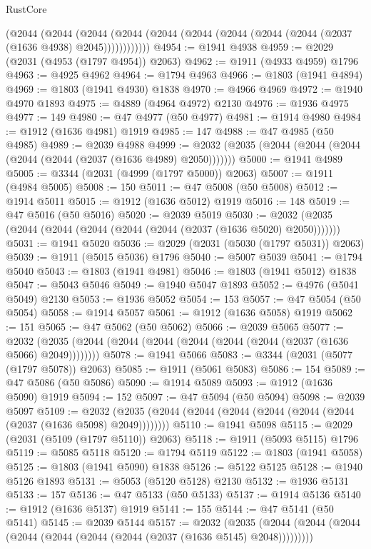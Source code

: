 \begin{lexlean}{RustCore}
\begin{coremodule}
        (@2044
          (@2044
            (@2044 (@2044 (@2044 (@2044 (@2044 (@2044 (@2044 (@2037 (@1636 @4938) @2045))))))))))))
@4954 := @1941 @4938
@4959 := @2029 (@2031 (@4953 (@1797 @4954)) @2063)
@4962 := @1911 (@4933 @4959) @1796
@4963 := @4925 @4962
@4964 := @1794 @4963
@4966 := @1803 (@1941 @4894)
@4969 := @1803 (@1941 @4930) @1838
@4970 := @4966 @4969
@4972 := @1940 @4970 @1893
@4975 := @4889 (@4964 @4972) @2130
@4976 := @1936 @4975
@4977 := 149
@4980 := @47 @4977 (@50 @4977)
@4981 := @1914 @4980
@4984 := @1912 (@1636 @4981) @1919
@4985 := 147
@4988 := @47 @4985 (@50 @4985)
@4989 := @2039 @4988
@4999 := @2032 (@2035 (@2044 (@2044 (@2044 (@2044 (@2044 (@2037 (@1636 @4989) @2050)))))))
@5000 := @1941 @4989
@5005 := @3344 (@2031 (@4999 (@1797 @5000)) @2063)
@5007 := @1911 (@4984 @5005)
@5008 := 150
@5011 := @47 @5008 (@50 @5008)
@5012 := @1914 @5011
@5015 := @1912 (@1636 @5012) @1919
@5016 := 148
@5019 := @47 @5016 (@50 @5016)
@5020 := @2039 @5019
@5030 := @2032 (@2035 (@2044 (@2044 (@2044 (@2044 (@2044 (@2037 (@1636 @5020) @2050)))))))
@5031 := @1941 @5020
@5036 := @2029 (@2031 (@5030 (@1797 @5031)) @2063)
@5039 := @1911 (@5015 @5036) @1796
@5040 := @5007 @5039
@5041 := @1794 @5040
@5043 := @1803 (@1941 @4981)
@5046 := @1803 (@1941 @5012) @1838
@5047 := @5043 @5046
@5049 := @1940 @5047 @1893
@5052 := @4976 (@5041 @5049) @2130
@5053 := @1936 @5052
@5054 := 153
@5057 := @47 @5054 (@50 @5054)
@5058 := @1914 @5057
@5061 := @1912 (@1636 @5058) @1919
@5062 := 151
@5065 := @47 @5062 (@50 @5062)
@5066 := @2039 @5065
@5077 := @2032 (@2035 (@2044 (@2044 (@2044 (@2044 (@2044 (@2044 (@2037 (@1636 @5066) @2049))))))))
@5078 := @1941 @5066
@5083 := @3344 (@2031 (@5077 (@1797 @5078)) @2063)
@5085 := @1911 (@5061 @5083)
@5086 := 154
@5089 := @47 @5086 (@50 @5086)
@5090 := @1914 @5089
@5093 := @1912 (@1636 @5090) @1919
@5094 := 152
@5097 := @47 @5094 (@50 @5094)
@5098 := @2039 @5097
@5109 := @2032 (@2035 (@2044 (@2044 (@2044 (@2044 (@2044 (@2044 (@2037 (@1636 @5098) @2049))))))))
@5110 := @1941 @5098
@5115 := @2029 (@2031 (@5109 (@1797 @5110)) @2063)
@5118 := @1911 (@5093 @5115) @1796
@5119 := @5085 @5118
@5120 := @1794 @5119
@5122 := @1803 (@1941 @5058)
@5125 := @1803 (@1941 @5090) @1838
@5126 := @5122 @5125
@5128 := @1940 @5126 @1893
@5131 := @5053 (@5120 @5128) @2130
@5132 := @1936 @5131
@5133 := 157
@5136 := @47 @5133 (@50 @5133)
@5137 := @1914 @5136
@5140 := @1912 (@1636 @5137) @1919
@5141 := 155
@5144 := @47 @5141 (@50 @5141)
@5145 := @2039 @5144
@5157 := @2032
    (@2035 (@2044 (@2044 (@2044 (@2044 (@2044 (@2044 (@2044 (@2037 (@1636 @5145) @2048)))))))))

\end{coremodule}
\end{lexlean}
